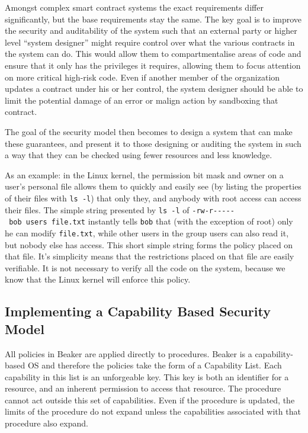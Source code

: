 \documentclass[english,a4paper]{article}
\begin{document}
Amongst complex smart contract systems the exact requirements differ
significantly, but the base requirements stay the same. The key goal is
to improve the security and auditability of the system such that an
external party or higher level ``system designer'' might require control
over what the various contracts in the system can do. This would allow
them to compartmentalise areas of code and ensure that it only has the
privileges it requires, allowing them to focus attention on more
critical high-risk code. Even if another member of the organization
updates a contract under his or her control, the system designer should
be able to limit the potential damage of an error or malign action by
sandboxing that contract.

The goal of the security model then becomes to design a system that can
make these guarantees, and present it to those designing or auditing the
system in such a way that they can be checked using fewer resources and
less knowledge.

As an example: in the Linux kernel, the permission bit mask and owner on
a user's personal file allows them to quickly and easily see (by listing
the properties of their files with \texttt{ls\ -l}) that only they, and
anybody with root access can access their files. The simple string
presented by \texttt{ls\ -l} of
\texttt{-rw-r-\/-\/-\/-\/-\ bob\ users\ file.txt} instantly tells
\texttt{bob} that (with the exception of root) only he can modify
\texttt{file.txt}, while other users in the group users can also read
it, but nobody else has access. This short simple string forms the
policy placed on that file. It's simplicity means that the restrictions
placed on that file are easily verifiable. It is not necessary to verify
all the code on the system, because we know that the Linux kernel will
enforce this policy.

\subsection{Implementing a Capability Based Security
Model}\label{implementing-a-capability-based-security-model}
All policies in Beaker are applied directly to procedures. Beaker is a
capability-based OS and therefore the policies take the form of a
Capability List. Each capability in this list is an unforgeable key.
This key is both an identifier for a resource, and an inherent
permission to access that resource. The procedure cannot act outside
this set of capabilities. Even if the procedure is updated, the limits
of the procedure do not expand unless the capabilities associated with
that procedure also expand.
\end{document}
